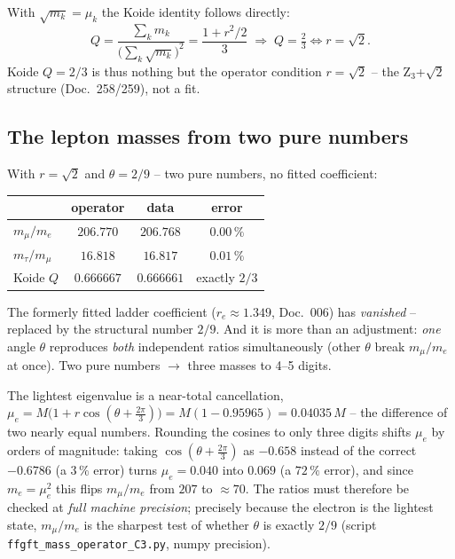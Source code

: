 With $\sqrt{m_k}=\mu_k$ the Koide identity follows directly:
\begin{equation}
  Q=\frac{\sum_k m_k}{\bigl(\sum_k\sqrt{m_k}\bigr)^2}=\frac{1+r^2/2}{3}
  \;\Longrightarrow\; Q=\tfrac23 \iff r=\sqrt2.
\end{equation}
Koide $Q=2/3$ is thus nothing but the operator condition $r=\sqrt2$ -- the
Z$_3$+$\sqrt2$ structure (Doc.~258/259), not a fit.

\subsection{The lepton masses from two pure numbers}

With $r=\sqrt2$ and $\theta=2/9$ -- two pure numbers, no fitted coefficient:

\begin{center}
\begin{tabular}{lccc}
\toprule
 & operator & data & error \\
\midrule
$m_\mu/m_e$    & $206.770$ & $206.768$ & $0.00\,\%$ \\
$m_\tau/m_\mu$ & $16.818$  & $16.817$  & $0.01\,\%$ \\
Koide $Q$      & $0.666667$ & $0.666661$ & exactly $2/3$ \\
\bottomrule
\end{tabular}
\end{center}

\begin{keyresult}
The formerly fitted ladder coefficient ($r_e\approx1.349$, Doc.~006) has
\emph{vanished} -- replaced by the structural number $2/9$. And it is more than
an adjustment: \emph{one} angle $\theta$ reproduces \emph{both} independent
ratios simultaneously (other $\theta$ break $m_\mu/m_e$ at once). Two pure
numbers $\to$ three masses to 4--5 digits.
\end{keyresult}

\begin{warningboxenv}
The lightest eigenvalue is a near-total cancellation,
$\mu_e = M\bigl(1+r\cos(\theta+\tfrac{2\pi}{3})\bigr)
       = M(1-0.95965) = 0.04035\,M$ -- the difference of two nearly equal
numbers. Rounding the cosines to only three digits shifts $\mu_e$ by orders of
magnitude: taking $\cos(\theta+\tfrac{2\pi}{3})$ as $-0.658$ instead of the
correct $-0.6786$ (a $3\,\%$ error) turns $\mu_e=0.040$ into $0.069$ (a
$72\,\%$ error), and since $m_e=\mu_e^2$ this flips $m_\mu/m_e$ from $207$ to
$\approx 70$. The ratios must therefore be checked at \emph{full machine precision};
precisely because the electron is the lightest state, $m_\mu/m_e$ is the
sharpest test of whether $\theta$ is exactly $2/9$ (script
\texttt{ffgft\_mass\_operator\_C3.py}, numpy precision).
\end{warningboxenv}

